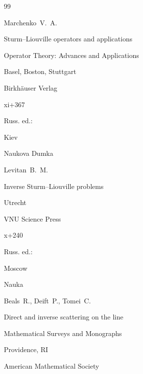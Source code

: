 \begin{thebibliography}{99}




\by Marchenko~V.~A.

\book Sturm--Liouville operators and applications


\serial Operator Theory: Advances and Applications


\publaddr Basel, Boston, Stuttgart

\publ Birkh\"auser Verlag

\totalpages xi+367 


\moreref Russ. ed.:

\publaddr Kiev

\publ Naukova Dumka









\by Levitan~B.~M.

\book Inverse Sturm--Liouville problems


\publaddr Utrecht

\publ VNU Science Press

\totalpages x+240 


\moreref Russ. ed.:


\publaddr Moscow

\publ Nauka






\by Beals~R.,  Deift~P., Tomei~C.

\book Direct and inverse scattering on the line


\serial Mathematical Surveys and Monographs


\publaddr Providence, RI

\publ American Mathematical Society 


\end{thebibliography}
